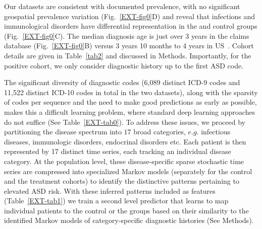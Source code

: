 \documentclass[3p,super,numbers,sort&compress,preprint,10pt]{elsarticle}
\begin{document}
Our datasets are consistent with documented prevalence, with no significant geospatial prevalence variation (Fig.~\ref{EXT-fig0}D) and reveal that  infections and immunological disorders have differential representation in the \treatment and control groups (Fig.~\ref{EXT-fig0}C).  The  median diagnosis age is  just over  3 years in the claims database (Fig.~\ref{EXT-fig0}B)  versus 3 years 10 months to 4 years  in US~\cite{pmid29701730}. Cohort details are given in Table~\ref{tab2} and discussed in Methods. Importantly, for the positive cohort, we only consider diagnostic history up to the first ASD code.

The significant diversity of diagnostic codes (6,089 distinct ICD-9 codes and 11,522 distinct ICD-10 codes in total in the two datasets), along with the sparsity of codes per sequence and the need to make good predictions as early as possible,  makes this a difficult learning problem, where standard deep learning approaches do not suffice (See Table~\ref{EXT-tab0}). To address these issues, we proceed by  partitioning the  disease spectrum into $17 $ broad categories, $e.g.$ infectious diseases, immunologic disorders, endocrinal disorders etc. Each patient is then represented by 17 distinct time series, each  tracking an individual disease category. At the population level, these disease-specific sparse stochastic time series are  compressed into specialized Markov models (separately for the control and the treatment cohorts) to identify  the distinctive patterns  pertaining to elevated ASD risk. With these inferred patterns included as features (Table~\ref{EXT-tab1}) we train a second level predictor that learns to map   individual patients  to the control or the \treatment groups based on their  similarity  to the identified  Markov models of category-specific diagnostic histories (See Methods). %
\end{document}
